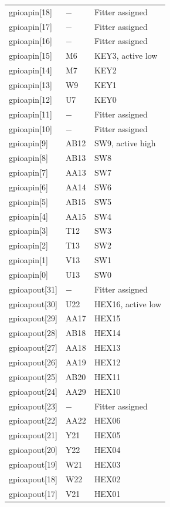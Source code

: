 \documentclass[12pt]{article}
\begin{document}
\begin{longtable}{lll}
gpioapin[18]  & $-$      & Fitter assigned \\
gpioapin[17]  & $-$      & Fitter assigned \\
gpioapin[16]  & $-$      & Fitter assigned \\
gpioapin[15]  & M6       & KEY3, active low \\
gpioapin[14]  & M7       & KEY2\\
gpioapin[13]  & W9       & KEY1\\
gpioapin[12]  & U7       & KEY0\\
gpioapin[11]  & $-$      & Fitter assigned \\
gpioapin[10]  & $-$      & Fitter assigned \\
gpioapin[9]   & AB12     & SW9, active high \\
gpioapin[8]   & AB13     & SW8 \\
gpioapin[7]   & AA13     & SW7 \\
gpioapin[6]   & AA14     & SW6 \\
gpioapin[5]   & AB15     & SW5 \\
gpioapin[4]   & AA15     & SW4 \\
gpioapin[3]   & T12      & SW3 \\
gpioapin[2]   & T13      & SW2 \\
gpioapin[1]   & V13      & SW1 \\
gpioapin[0]   & U13      & SW0 \\
gpioapout[31] & $-$      & Fitter assigned \\
gpioapout[30] & U22      & HEX16, active low \\
gpioapout[29] & AA17     & HEX15 \\
gpioapout[28] & AB18     & HEX14 \\
gpioapout[27] & AA18     & HEX13 \\
gpioapout[26] & AA19     & HEX12 \\
gpioapout[25] & AB20     & HEX11 \\
gpioapout[24] & AA29     & HEX10 \\
gpioapout[23] & $-$      & Fitter assigned \\
gpioapout[22] & AA22     & HEX06 \\
gpioapout[21] & Y21      & HEX05 \\
gpioapout[20] & Y22      & HEX04 \\
gpioapout[19] & W21      & HEX03 \\
gpioapout[18] & W22      & HEX02 \\
gpioapout[17] & V21      & HEX01 \\

\end{longtable}
\end{document}

